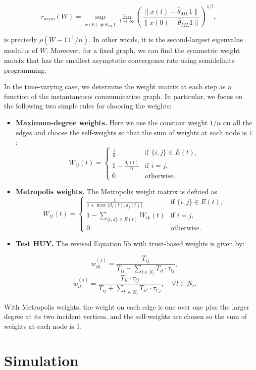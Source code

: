 \documentclass[letterpaper, 10pt, conference]{ieeeconf}  %
\begin{document}
\[
r_{\text{asym}}(W) = \sup_{x(0) \neq \hat{\theta}_{ML}1} \lim_{t \to \infty} \left(\frac{\|x(t) - \hat{\theta}_{ML}1\|}{\|x(0) - \hat{\theta}_{ML}1\|}\right)^{1/t},
\]

is precisely $\rho(W - 11^\top / n)$. In other words, it is the second-largest eigenvalue modulus of $W$. Moreover, for a fixed graph, we can find the symmetric weight matrix that has the smallest asymptotic convergence rate using semidefinite programming.

In the time-varying case, we determine the weight matrix at each step as a function of the instantaneous communication graph. In particular, we focus on the following two simple rules for choosing the weights:

\begin{itemize}
    \item \textbf{Maximum-degree weights.} Here we use the constant weight $1/n$ on all the edges and choose the self-weights so that the sum of weights at each node is $1$:
    \[
    W_{ij}(t) = 
    \begin{cases} 
    \frac{1}{n} & \text{if } \{i, j\} \in E(t), \\
    1 - \frac{d_i(t)}{n} & \text{if } i = j, \\
    0 & \text{otherwise}.
    \end{cases}
    \]
    \item \textbf{Metropolis weights.} The Metropolis weight matrix is defined as
    \[
    W_{ij}(t) = 
    \begin{cases} 
    \frac{1}{1 + \max\{d_i(t), d_j(t)\}} & \text{if } \{i, j\} \in E(t), \\
    1 - \sum_{\{i, k\} \in E(t)} W_{ik}(t) & \text{if } i = j, \\
    0 & \text{otherwise}.
    \end{cases}
    \]
    \item \textbf{Test HUY.} The revised Equation 5b with trust-based weights is given by:
    
    \[
    w_{i0}^{(j)} = \frac{T_{ij}}{T_{ij} + \sum_{l \in N_i} T_{il} \cdot \tau_{lj}},
    \]
    \[
    w_{il}^{(j)} = \frac{T_{il} \cdot \tau_{lj}}{T_{ij} + \sum_{l' \in N_i} T_{il'} \cdot \tau_{l'j}}, \quad \forall l \in N_i.
    \]

\end{itemize}

With Metropolis weights, the weight on each edge is one over one plus the larger degree at its two incident vertices, and the self-weights are chosen so the sum of weights at each node is $1$.

\section{Simulation}
\end{document}

